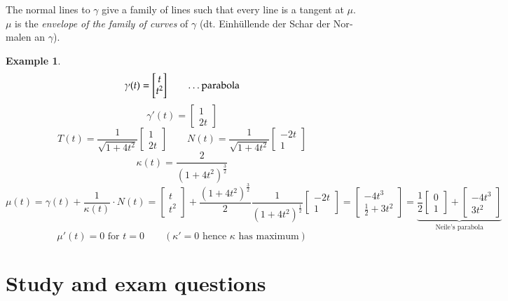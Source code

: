 \documentclass{article}
\newtheorem{example}{Example}  \numberwithin{example}{section}
\begin{document}
The normal lines to $\gamma$ give a family of lines such that every line is a tangent at $\mu$.
$\mu$ is the \emph{envelope of the family of curves} of $\gamma$ (dt. \foreignlanguage{german}{Einh\"ullende der Schar der Normalen an $\gamma$}).

\begin{example}
  \[ \gamma(t) = \begin{bmatrix} t \\ t^2 \end{bmatrix} \qquad \text{\dots parabola} \]
  \[ \gamma'(t) = \begin{bmatrix} 1 \\ 2t \end{bmatrix} \]
  \[ T(t) = \frac{1}{\sqrt{1 + 4t^2}} \begin{bmatrix} 1 \\ 2t \end{bmatrix} \qquad N(t) = \frac{1}{\sqrt{1 + 4t^2}} \begin{bmatrix} -2t \\ 1 \end{bmatrix} \]
  \[ \kappa(t) = \frac{2}{(1 + 4t^2)^{\frac32}} \]
  \[ \mu(t) = \gamma(t) + \frac{1}{\kappa(t)} \cdot N(t) = \begin{bmatrix} t \\ t^2 \end{bmatrix} + \frac{(1 + 4t^2)^{\frac32}}{2} \frac{1}{(1 + 4t^2)^{\frac12}} \begin{bmatrix} -2t \\ 1 \end{bmatrix} = \begin{bmatrix} -4t^3 \\ \frac12 + 3t^2 \end{bmatrix} = \underbrace{\frac12 \begin{bmatrix} 0 \\ 1 \end{bmatrix} + \begin{bmatrix} -4t^3 \\ 3t^2 \end{bmatrix}}_{\text{Neile's parabola}} \]
  \[ \mu'(t) = 0 \text{ for } t = 0 \qquad (\kappa' = 0 \text{ hence } \kappa \text{ has maximum}) \]
\end{example}


\appendix

\section{Study and exam questions}
\end{document}
